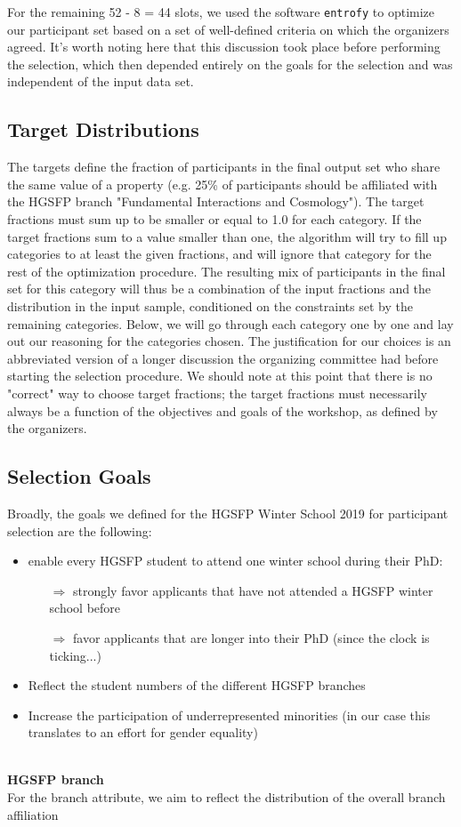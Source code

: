 For the remaining 52 - 8 = 44 slots, we used the software \texttt{entrofy} to optimize our participant set based on a set of well-defined criteria on which the organizers agreed. It's worth noting here that this discussion took place before performing the selection, which then depended entirely on the goals for the selection and was independent of the input data set. 

\subsection*{Target Distributions}
The targets define the fraction of participants in the final output set who share the same value of a property (e.g. 25\% of participants should be affiliated with the HGSFP branch "Fundamental Interactions and Cosmology"). The target fractions must sum up to be smaller or equal to 1.0 for each category. If the target fractions sum to a value smaller than one, the algorithm will try to fill up categories to at least the given fractions, and will ignore that category for the rest of the optimization procedure. The resulting mix of participants in the final set for this category will thus be a combination of the input fractions and the distribution in the input sample, conditioned on the constraints set by the remaining categories. Below, we will go through each category one by one and lay out our reasoning for the categories chosen. The justification for our choices is an abbreviated version of a longer discussion the organizing committee had before starting the selection procedure. We should note at this point that there is no "correct" way to choose target fractions; the target fractions must necessarily always be a function of the objectives and goals of the workshop, as defined by the organizers.

\subsection*{Selection Goals}
Broadly, the goals we defined for the HGSFP Winter School 2019 for participant selection are the following:
\begin{itemize}
	\item enable every HGSFP student to attend one winter school during their PhD:
	\begin{itemize}
		\item[$\Rightarrow$] strongly favor applicants that have not attended a HGSFP winter school before
		\item[$\Rightarrow$] favor applicants that are longer into their PhD (since the clock is ticking...)
	\end{itemize}
	\item Reflect the student numbers of the different HGSFP branches
	\item Increase the participation of underrepresented minorities (in our case this translates to an effort for gender equality)
\end{itemize}
~\\
\textbf{HGSFP branch}\\
For the branch attribute, we aim to reflect the distribution of the overall branch affiliation

